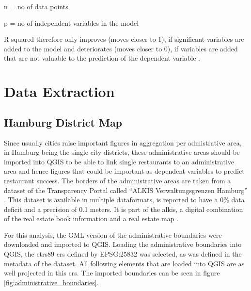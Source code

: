 \documentclass[a4paper, 11pt, oneside]{Thesis}  %
\begin{document}
n = no of data points

p = no of independent variables in the model

R-squared therefore only improves (moves closer to 1), if significant variables are added to the model and deteriorates (moves closer to 0), if variables are added that are not valuable to the prediction of the dependent variable \cite{Devasthali.2018}. 

\chapter{Data Extraction}

\section{Hamburg District Map}

Since usually cities raise important figures in aggregation per admistrative area, in Hamburg being the single city districts, these administrative areas should be imported into QGIS to be able to link single restaurants to an administrative area and hence figures that could be important as dependent variables to predict restaurant success. The borders of the administrative areas are taken from a dataset of the Transparency Portal called ``ALKIS Verwaltungsgrenzen Hamburg'' \cite{LandesbetriebGeoinformationundVermessung.28.02.2018}. This dataset is available in multiple dataformats, is reported to have a 0\% data deficit and a precision of 0.1 meters. It is part of the \ac{alkis}, a digital combination of the real estate book information and a real estate map \cite{ALKIS2019}.

For this analysis, the GML version of the administrative boundaries were downloaded and imported to QGIS. Loading the administrative boundaries into QGIS, the \ac{etrs89} \ac{crs} defined by EPSG:25832 was selected, as was defined in the metadata of the dataset. All following elements that are loaded into QGIS are as well projected in this \ac{crs}. The imported boundaries can be seen in figure \ref{fig:administrative_boundaries}.
\end{document}
